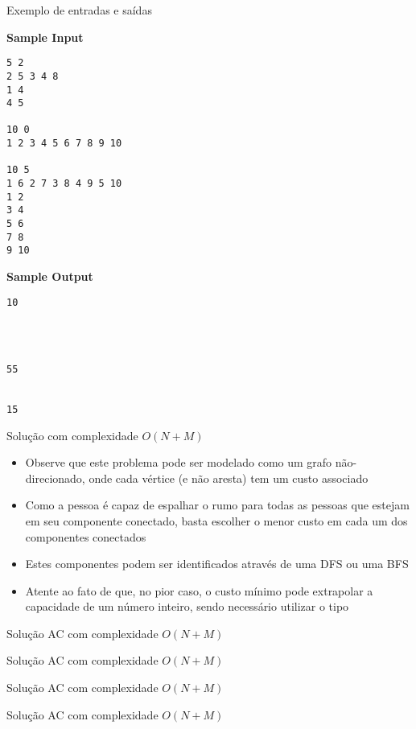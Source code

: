 \begin{frame}[fragile]{Exemplo de entradas e saídas}

\begin{minipage}[t]{0.5\textwidth}
\textbf{Sample Input}
\begin{verbatim}
5 2
2 5 3 4 8
1 4
4 5

10 0
1 2 3 4 5 6 7 8 9 10

10 5
1 6 2 7 3 8 4 9 5 10
1 2
3 4
5 6
7 8
9 10
\end{verbatim}

\end{minipage}
\begin{minipage}[t]{0.45\textwidth}
\textbf{Sample Output}
\begin{verbatim}
10




55


15
\end{verbatim}
\end{minipage}
\end{frame}

\begin{frame}[fragile]{Solução com complexidade $O(N + M)$}

    \begin{itemize}
        \item Observe que este problema pode ser modelado como um grafo não-direcionado,
            onde cada vértice (e não aresta) tem um custo associado

        \item Como a pessoa é capaz de espalhar o rumo para todas as pessoas que estejam
            em seu componente conectado, basta escolher o menor custo em cada um dos
            componentes conectados

        \item Estes componentes podem ser identificados através de uma DFS ou uma BFS

        \item Atente ao fato de que, no pior caso, o custo mínimo pode extrapolar a capacidade
            de um número inteiro, sendo necessário utilizar o tipo 
   \end{itemize}

\end{frame}

\begin{frame}[fragile]{Solução AC com complexidade $O(N + M)$}
\end{frame}

\begin{frame}[fragile]{Solução AC com complexidade $O(N + M)$}
\end{frame}

\begin{frame}[fragile]{Solução AC com complexidade $O(N + M)$}
\end{frame}

\begin{frame}[fragile]{Solução AC com complexidade $O(N + M)$}
\end{frame}

